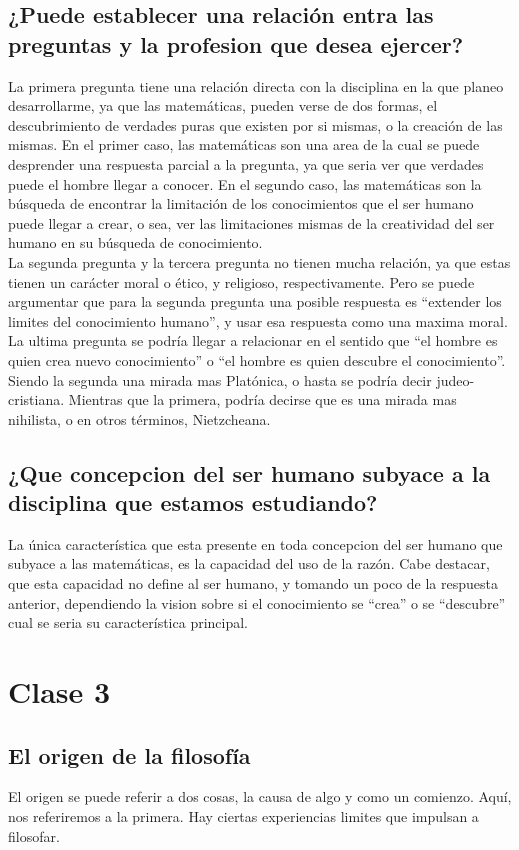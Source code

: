 \documentclass[11pt]{book}
\begin{document}
    \section{¿Puede establecer una relación entra las preguntas y la profesion que desea ejercer?}
    La primera pregunta tiene una relación directa con la disciplina en la que planeo desarrollarme, ya que las matemáticas, pueden verse de dos formas, el descubrimiento de verdades puras que existen por si mismas, o la creación de las mismas. En el primer caso, las matemáticas son una area de la cual se puede desprender una respuesta parcial a la pregunta, ya que seria ver que verdades puede el hombre llegar a conocer. En el segundo caso, las matemáticas son la búsqueda de encontrar la limitación de los conocimientos que el ser humano puede llegar a crear, o sea, ver las limitaciones mismas de la creatividad del ser humano en su búsqueda de conocimiento.\\
    La segunda pregunta y la tercera pregunta no tienen mucha relación, ya que estas tienen un carácter moral o ético, y religioso, respectivamente. Pero se puede argumentar que para la segunda pregunta una posible respuesta es ``extender los limites del conocimiento humano'', y usar esa respuesta como una maxima moral.\\
    La ultima pregunta se podría llegar a relacionar en el sentido que ``el hombre es quien crea nuevo conocimiento'' o ``el hombre es quien descubre el conocimiento''. Siendo la segunda una mirada mas Platónica, o hasta se podría decir judeo-cristiana. Mientras que la primera, podría decirse que es una mirada mas nihilista, o en otros términos, Nietzcheana.

    \section{¿Que concepcion del ser humano subyace a la disciplina que estamos estudiando?}
    La única característica que esta presente en toda concepcion del ser humano que subyace a las matemáticas, es la capacidad del uso de la razón. Cabe destacar, que esta capacidad no define al ser humano, y tomando un poco de la respuesta anterior, dependiendo la vision sobre si el conocimiento se ``crea'' o se ``descubre'' cual se seria su característica principal.

    \chapter{Clase 3}
    \section{El origen de la filosofía}
    El origen se puede referir a dos cosas, la causa de algo y como un comienzo. Aquí, nos referiremos a la primera. Hay ciertas experiencias limites que impulsan a filosofar.
\end{document}
